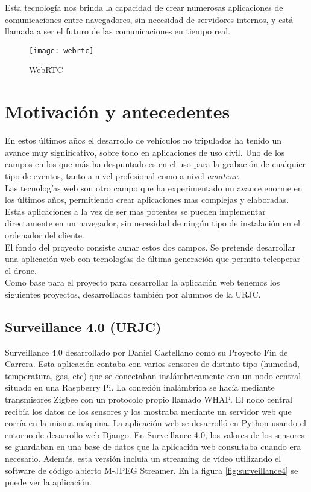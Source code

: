 Esta tecnología nos brinda la capacidad de crear numerosas aplicaciones de comunicaciones entre navegadores, sin necesidad de servidores internos, y está llamada a ser el futuro de las comunicaciones en tiempo real.\\

\begin{figure}[htb]
\centering
\texttt{[image: webrtc]}
\caption{WebRTC}
\label{fig:webrtc}
\end{figure}



\section{Motivación y antecedentes}

En estos últimos años el desarrollo de vehículos no tripulados ha tenido un avance muy significativo, sobre todo en aplicaciones de uso civil. Uno de los campos en los que más ha despuntado es en el uso para la grabación de cualquier tipo de eventos, tanto a nivel profesional como a nivel \emph{amateur}.\\

Las tecnologías web son otro campo que ha experimentado un avance enorme en los últimos años, permitiendo crear aplicaciones mas complejas y elaboradas. Estas aplicaciones a la vez de ser mas potentes se pueden implementar directamente en un navegador, sin necesidad de ningún tipo de instalación en el ordenador del cliente.\\

El fondo del proyecto consiste aunar estos dos campos. Se pretende desarrollar una aplicación web con tecnologías de última generación que permita teleoperar el drone.\\

Como base para el proyecto para desarrollar la aplicación web tenemos los siguientes proyectos, desarrollados también por alumnos de la URJC.\\

\subsection{Surveillance 4.0 (URJC)}

Surveillance 4.0 desarrollado por Daniel Castellano como su Proyecto Fin de Carrera. Esta aplicación contaba con varios sensores de distinto tipo (humedad, temperatura, gas, etc) que se conectaban inalámbricamente con un nodo central situado en una Raspberry Pi. La conexión inalámbrica se hacía mediante transmisores Zigbee con un protocolo propio llamado WHAP. El nodo central recibía los datos de los sensores y los mostraba mediante un servidor web que corría en la misma máquina. La aplicación web se desarrolló en Python usando el entorno de desarrollo web Django. En Surveillance 4.0, los valores de los sensores se guardaban en una base de datos que la aplicación web consultaba cuando era necesario. Además, esta versión incluía un streaming de vídeo utilizando el software de código abierto M-JPEG Streamer. En la figura \ref{fig:surveillance4} se puede ver la aplicación.\\

